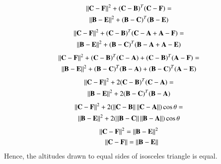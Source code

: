 \begin{multline}
\left\lVert\mathbf{C-F}\right\rVert^2+\mathbf{(C-B)}^T\mathbf{(C-F)}=\\\left\lVert\mathbf{B-E}\right\rVert^2+\mathbf{(B-C)}^T\mathbf{(B-E)}
\end{multline}
\begin{multline}
\left\lVert\mathbf{C-F}\right\rVert^2+\mathbf{(C-B)}^T\mathbf{(C-A+A-F)}=\\
\left\lVert\mathbf{B-E}\right\rVert^2+\mathbf{(B-C)}^T\mathbf{(B-A+A-E)}
\end{multline}
\begin{multline}
\left\lVert\mathbf{C-F}\right\rVert^2+\mathbf{(C-B)}^T\mathbf{(C-A)}+\mathbf{(C-B)}^T\mathbf{(A-F)}=\\
\left\lVert\mathbf{B-E}\right\rVert^2+\mathbf{(B-C)}^T\mathbf{(B-A)}+\mathbf{(B-C)}^T\mathbf{(A-E)}
\end{multline}
\begin{multline}
\left\lVert\mathbf{C-F}\right\rVert^2+2\mathbf{(C-B)}^T\mathbf{(C-A)}=\\
\left\lVert\mathbf{B-E}\right\rVert^2+2\mathbf{(B-C)}^T\mathbf{(B-A)}
\end{multline}
\begin{multline}
\left\lVert\mathbf{C-F}\right\rVert^2+2(\left\lVert\mathbf{C-B}\right\rVert\left\lVert\mathbf{C-A}\right\rVert)\cos\theta=\\
\left\lVert\mathbf{B-E}\right\rVert^2+2(\left\lVert\mathbf{B-C}\right\rVert\left\lVert\mathbf{B-A}\right\rVert)\cos\theta
\end{multline}
\begin{align}
\left\lVert\mathbf{C-F}\right\rVert^2=\left\lVert\mathbf{B-E}\right\rVert^2\\
\left\lVert\mathbf{C-F}\right\rVert=\left\lVert\mathbf{B-E}\right\rVert
\end{align}
Hence, the altitudes drawn to equal sides of isosceles triangle is equal.

